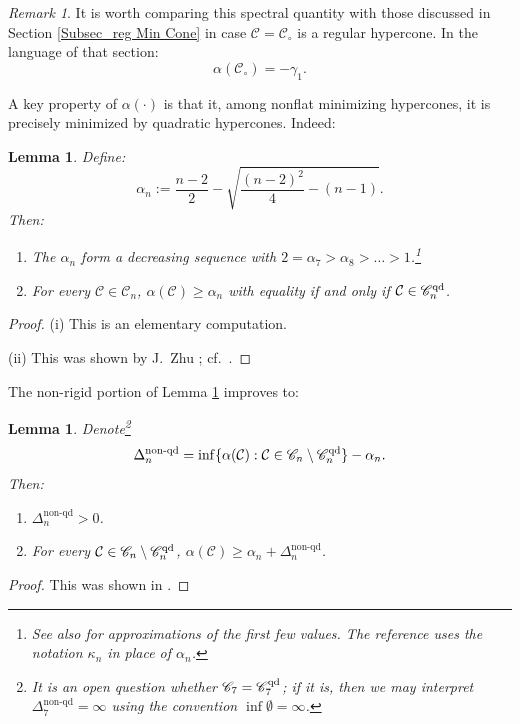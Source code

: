 \documentclass[11pt, letterpaper, reqno]{amsart}
\numberwithin{equation}{section}
\newtheorem{Lem}[Def]{Lemma}
\theoremstyle{remark}
\newtheorem{Rem}[Def]{Remark}
\newcommand{\cC}{\mathcal{C}}
\begin{document}
\begin{Rem} \label{rema:lambda.gamma.compared}
	It is worth comparing this spectral quantity with those discussed in Section \ref{Subsec_reg Min Cone} in case $\cC = \cC_\circ$ is a regular hypercone. In the language of that section:
	\[ \alpha(\cC_\circ) = -\gamma_1. \]
\end{Rem}


A key property of $\alpha(\cdot)$ is that it, among nonflat minimizing hypercones, it is precisely minimized by quadratic hypercones. Indeed:

\begin{Lem} \label{lemm:kappa.zhu}
	Define:
	\begin{equation} \label{eq:kappa.n}
		\alpha_n := \frac{n-2}{2} - \sqrt{\frac{(n-2)^2}{4} - (n-1)}.
	\end{equation}
	Then:
	\begin{enumerate}
		\item[(i)] The $\alpha_n$ form a decreasing sequence with $2 = \alpha_7 > \alpha_8 > \ldots > 1$.\footnote{See also \cite[Remark 3.9]{CMS:generic.9.10} for approximations of the first few values. The reference uses the notation $\kappa_n$ in place of $\alpha_n$.}
		\item[(ii)] For every $\cC \in \mathscr{C}_n$, $\alpha(\cC) \geq \alpha_n$ with equality if and only if $\cC \in \mathscr{C}_n^{\textnormal{qd}}$. 
	\end{enumerate}
\end{Lem}
\begin{proof}
	(i) This is an elementary computation.
	
	(ii) This was shown by J.\ Zhu \cite{Zhu:stability}; cf.\ \cite{Simons:minvar,Lawson:rigid,CherndoCarmoKobayashi,Perdomo,Wu}.
\end{proof}

The non-rigid portion of Lemma \ref{lemm:kappa.zhu} improves to:

\begin{Lem} \label{lemm:kappa.zhu.nonqd}
	Denote\footnote{It is an open question whether $\mathscr{C}_7 = \mathscr{C}_7^{\textnormal{qd}}$; if it is, then we may interpret $\Delta^{\operatorname{non-qd}}_7 = \infty$ using the convention $\inf \emptyset = \infty$.}
	\begin{equation} \label{eq:delta.nonqd.gap}
		\Delta^{\operatorname{non-qd}}_n = \inf \{ \alpha(\cC) : \cC \in \mathscr{C}_n \setminus \mathscr{C}_n^{\textnormal{qd}} \} - \alpha_n.
	\end{equation}
	Then:
	\begin{enumerate}
		\item[(i)] $\Delta^{\operatorname{non-qd}}_n>0$.
		\item[(ii)] For every $\cC \in \mathscr{C}_n \setminus \mathscr{C}_n^{\textnormal{qd}}$, $\alpha(\cC) \geq \alpha_n + \Delta^{\operatorname{non-qd}}_n$. 
	\end{enumerate}
\end{Lem}
\begin{proof}
	This was shown in \cite[Appendix A]{Wang:smoothing}.
\end{proof}
\end{document}
